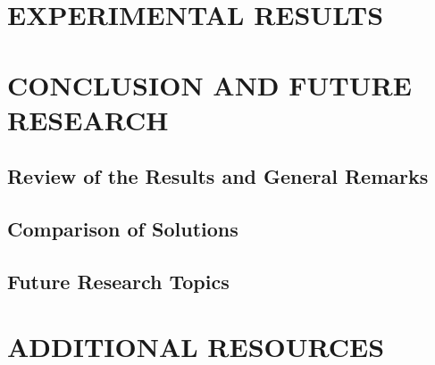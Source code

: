 \documentclass[12pt,reqno,oneside]{pucthesis}         %
\begin{document}

\chapter[EXPERIMENTAL RESULTS]{EXPERIMENTAL RESULTS}



\chapter{CONCLUSION AND FUTURE RESEARCH}

\section{Review of the Results and General Remarks}
\section{Comparison of Solutions}
\section{Future Research Topics}




 






\appendix
\chapter[ADDITIONAL RESOURCES]{ADDITIONAL RESOURCES}
\end{document}
